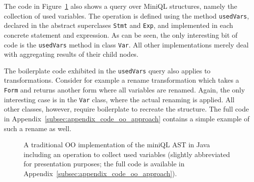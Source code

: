 The code in Figure~\ref{ql_oo_approach} also shows a query over MiniQL structures, namely the collection of used variables.
The operation is defined using the method \lstinline{usedVars}, declared in the abstract superclases  \lstinline{Stmt} and \lstinline{Exp}, and implemented in each concrete statement and expression. 
As can be seen, the only interesting bit of code is the \lstinline{usedVars} method in class \lstinline{Var}.
All other implementations merely deal with aggregating results of their child nodes.

The boilerplate code exhibited in the \lstinline{usedVars} query also applies to transformations.
Consider for example a rename transformation which takes a \lstinline{Form} and returns another form where all variables are renamed.
Again, the only interesting case is in the \lstinline{Var} class, where the actual renaming is applied. All other classes, however, require boilerplate to recreate the structure.
The full code in Appendix~\ref{subsec:appendix_code_oo_approach} contains a simple example of such a rename as well. 


\begin{figure}[t]
\nocaptionrule
\caption{A traditional OO implementation of the miniQL AST in Java including an operation to collect used variables (slightly abbreviated for presentation purposes; the full code is available in Appendix~\ref{subsec:appendix_code_oo_approach}).}
\label{ql_oo_approach}
\end{figure}


